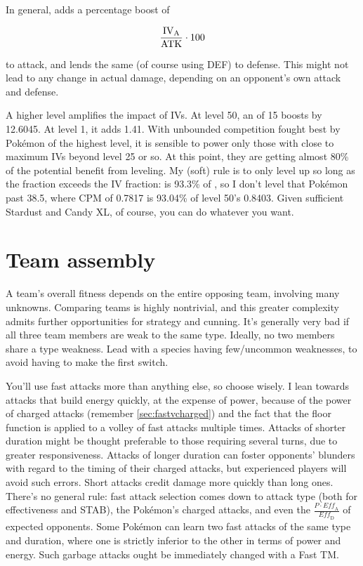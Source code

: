 In general,  adds a percentage boost of

\[ \frac{\mbox{$\text{IV}_\text{A}$}}{\mathrm{ATK}} \cdot 100 \]

\noindent{}to attack, and  lends the same (of course using DEF) to defense.
This might not lead to any change in actual damage, depending on an opponent's own attack and defense.

A higher level amplifies the impact of IVs.
At level 50, an  of 15 boosts  by 12.6045.
At level 1, it adds 1.41.
With unbounded competition fought best by Pokémon of the highest level, it is
 sensible to power only those with close to maximum IVs beyond level 25 or so.
At this point, they are getting almost 80\% of the potential benefit from leveling.
My (soft) rule is to only level up so long as the \CPM{} fraction exceeds the IV fraction:
  is 93.3\% of , so I don't level that Pokémon
 past 38.5, where CPM of 0.7817 is 93.04\% of level 50's 0.8403.
Given sufficient Stardust and Candy XL, of course, you can do whatever you want.

\section{Team assembly}
A team's overall fitness depends on the entire opposing team, involving many unknowns.
Comparing teams is highly nontrivial, and this greater complexity admits
 further opportunities for strategy and cunning.
It's generally very bad if all three team members are weak to the same type.
Ideally, no two members share a type weakness.
Lead with a species having few/uncommon weaknesses, to avoid having to make the first switch.

You'll use fast attacks more than anything else, so choose wisely.
I lean towards attacks that build energy quickly, at the expense of power,
 because of the power of charged attacks (remember \autoref{sec:fastvcharged})
 and the fact that the floor function is applied to a volley of fast attacks multiple times.
Attacks of shorter duration might be thought preferable to those requiring
  several turns, due to greater responsiveness.
Attacks of longer duration can foster opponents' blunders with regard to the
  timing of their charged attacks, but experienced players will avoid such errors.
Short attacks credit damage more quickly than long ones.
There's no general rule: fast attack selection comes down to attack type
  (both for effectiveness and STAB), the Pokémon's charged attacks,
  and even the $\frac{P \cdot \mathit{Eff_\mathrm{A}}}{\mathit{Eff_\mathrm{D}}}$ of expected opponents.
Some Pokémon can learn two fast attacks of the same type and duration,
  where one is strictly inferior to the other in terms of power and energy.
Such garbage attacks ought be immediately changed with a Fast TM\@.


